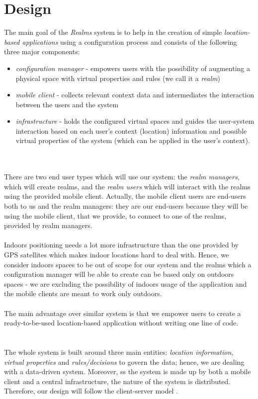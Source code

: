 \section{Design} %
\label{sec:design}
The main goal of the \emph{Realms} system is to help in the creation of simple \emph{location-based applications} using a configuration process and consists of the following three major components:
\begin{itemize}
	\item \emph{configuration manager} - empowers users with the possibility of augmenting a physical space with virtual properties and rules (we call it a \emph{realm})
	\item \emph{mobile client} - collects relevant context data and intermediates the interaction between the users and the system
	\item \emph{infrastructure} - holds the configured virtual spaces and guides the user-system interaction based on each user's context (location) information and possible virtual properties of the system (which can be applied in the user's context).
\end{itemize}
\\\\
There are two end user types which will use our system: the \emph{realm managers}, which will create realms, and the \emph{realm users} which will interact with the realms using the provided mobile client. Actually, the mobile client users are end-users both to us and the realm managers: they are our end-users because they will be using the mobile client, that we provide, to connect to one of the realms, provided by realm managers.
\\\\
Indoors positioning needs a lot more infrastructure than the one provided by GPS satellites which makes indoor locations hard to deal with. Hence, we consider indoors spaces to be out of scope for our system and the realms which a configuration manager will be able to create can be based only on outdoors spaces - we are excluding the possibility of indoors usage of the application and the mobile clients are meant to work only outdoors.
\\\\
The main advantage over similar system is that we empower users to create a ready-to-be-used location-based application without writing one line of code.\\
\\\\
The whole system is built around three main entities: \emph{location information}, \emph{virtual properties} and \emph{rules/decisions} to govern the data; hence, we are dealing with a data-driven system. Moreover, ss the system is made up by both a mobile client and a central infrastructure, the nature of the system is distributed. Therefore, our design will follow the client-server model \cite{Coulouris:2005}.
